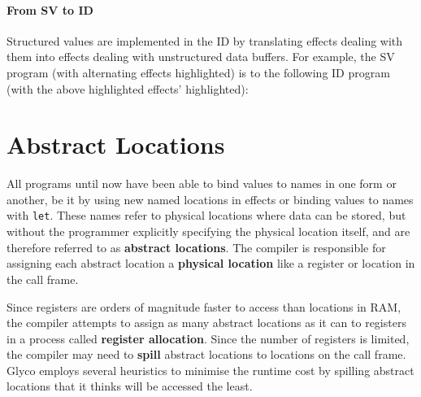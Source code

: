 \documentclass[main.tex]{subfiles}
\begin{document}
\paragraph{From SV to ID} Structured values are implemented in the  ID by translating effects dealing with them into effects dealing with unstructured data buffers. For example, the SV program (with alternating effects highlighted)
is \lowered{} to the following ID program (with the above highlighted effects'  highlighted):

\section{Abstract Locations} \label{sct:id}
All programs until now have been able to bind values to names in one form or another, be it by using new named locations in effects or binding values to names with \texttt{let}. These names refer to physical locations where data can be stored, but without the programmer explicitly specifying the physical location itself, and are therefore referred to as \textbf{abstract locations}. The compiler is responsible for assigning each abstract location a \textbf{physical location} like a register or location in the call frame.

Since registers are orders of magnitude faster to access than locations in RAM, the compiler attempts to assign as many abstract locations as it can to registers in a process called \textbf{register allocation}. Since the number of registers is limited, the compiler may need to \textbf{spill} abstract locations to locations on the call frame. Glyco employs several heuristics to minimise the runtime cost by spilling abstract locations that it thinks will be accessed the least.
\end{document}
